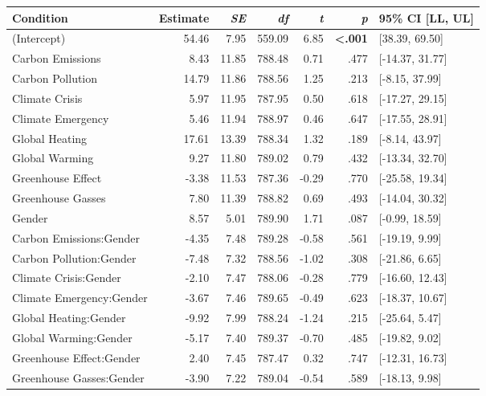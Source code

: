 \begin{table}[ht]
\centering
\begin{tabular}{lrrrrrl}
  \hline
Condition & Estimate & \textit{SE} & \textit{df} & \textit{t} & \textit{p} & 95\% CI [LL, UL] \\ 
  \hline
(Intercept) & 54.46 & 7.95 & 559.09 & 6.85 & \textbf{\textless  .001} & [38.39, 69.50] \\ 
  Carbon Emissions & 8.43 & 11.85 & 788.48 & 0.71 & .477 & [-14.37, 31.77] \\ 
  Carbon Pollution & 14.79 & 11.86 & 788.56 & 1.25 & .213 & [-8.15, 37.99] \\ 
  Climate Crisis & 5.97 & 11.95 & 787.95 & 0.50 & .618 & [-17.27, 29.15] \\ 
  Climate Emergency & 5.46 & 11.94 & 788.97 & 0.46 & .647 & [-17.55, 28.91] \\ 
  Global Heating & 17.61 & 13.39 & 788.34 & 1.32 & .189 & [-8.14, 43.97] \\ 
  Global Warming & 9.27 & 11.80 & 789.02 & 0.79 & .432 & [-13.34, 32.70] \\ 
  Greenhouse Effect & -3.38 & 11.53 & 787.36 & -0.29 & .770 & [-25.58, 19.34] \\ 
  Greenhouse Gasses & 7.80 & 11.39 & 788.82 & 0.69 & .493 & [-14.04, 30.32] \\ 
  Gender & 8.57 & 5.01 & 789.90 & 1.71 & .087 & [-0.99, 18.59] \\ 
  Carbon Emissions:Gender & -4.35 & 7.48 & 789.28 & -0.58 & .561 & [-19.19, 9.99] \\ 
  Carbon Pollution:Gender & -7.48 & 7.32 & 788.56 & -1.02 & .308 & [-21.86, 6.65] \\ 
  Climate Crisis:Gender & -2.10 & 7.47 & 788.06 & -0.28 & .779 & [-16.60, 12.43] \\ 
  Climate Emergency:Gender & -3.67 & 7.46 & 789.65 & -0.49 & .623 & [-18.37, 10.67] \\ 
  Global Heating:Gender & -9.92 & 7.99 & 788.24 & -1.24 & .215 & [-25.64, 5.47] \\ 
  Global Warming:Gender & -5.17 & 7.40 & 789.37 & -0.70 & .485 & [-19.82, 9.02] \\ 
  Greenhouse Effect:Gender & 2.40 & 7.45 & 787.47 & 0.32 & .747 & [-12.31, 16.73] \\ 
  Greenhouse Gasses:Gender & -3.90 & 7.22 & 789.04 & -0.54 & .589 & [-18.13, 9.98] \\ 
   \hline
\end{tabular}
\end{table}
